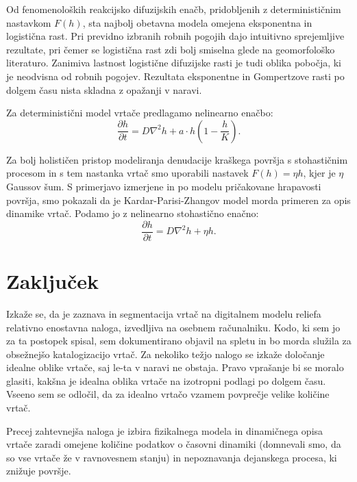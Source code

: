 \documentclass[a4paper, twoside, 12pt]{book}
\begin{document}
Od fenomenoloških reakcijsko difuzijskih enačb, pridobljenih z determinističnim nastavkom $F(h)$, sta najbolj obetavna modela omejena eksponentna in logistična rast. Pri previdno izbranih robnih pogojih dajo intuitivno sprejemljive rezultate, pri čemer se logistična rast zdi bolj smiselna glede na geomorfološko literaturo. Zanimiva lastnost logistične difuzijske rasti je tudi oblika pobočja, ki je neodvisna od robnih pogojev.
Rezultata eksponentne in Gompertzove rasti po dolgem času nista skladna z opažanji v naravi.

Za deterministični model vrtače predlagamo nelinearno enačbo:
\begin{equation}
  \frac{ \partial h}{ \partial t} = D \nabla^2 h + a \cdot h (1 - \frac{h}{K}).
  \label{dinamicna-splosna4}
\end{equation}

Za bolj holističen pristop modeliranja denudacije kraškega površja s stohastičnim procesom in s tem nastanka vrtač smo uporabili nastavek $F(h) = \eta h$, kjer je $\eta$ Gaussov šum. S primerjavo izmerjene in po modelu pričakovane hrapavosti površja, smo pokazali da je Kardar-Parisi-Zhangov model morda primeren za opis dinamike vrtač. Podamo jo z nelinearno stohastično enačno:
\begin{equation}
  \frac{ \partial h}{ \partial t} = D \nabla^2 h + \eta h.
  \label{dinamicna-splosna5}
\end{equation}

    \chapter{Zaključek}

    Izkaže se, da je zaznava in segmentacija vrtač na digitalnem modelu reliefa relativno enostavna naloga, izvedljiva na osebnem računalniku. Kodo, ki sem jo za ta postopek spisal, sem dokumentirano objavil na spletu in bo morda služila za obsežnejšo katalogizacijo vrtač.
    Za nekoliko težjo nalogo se izkaže določanje idealne oblike vrtače, saj le-ta v naravi ne obstaja. Pravo vprašanje bi se moralo glasiti, kakšna je idealna oblika vrtače na izotropni podlagi po dolgem času. Vseeno sem se odločil, da za idealno vrtačo vzamem povprečje velike količine vrtač.

    Precej zahtevnejša naloga je izbira fizikalnega modela in dinamičnega opisa vrtače zaradi omejene količine podatkov o časovni dinamiki (domnevali smo, da so vse vrtače že v ravnovesnem stanju) in nepoznavanja dejanskega procesa, ki znižuje površje.
\end{document}
